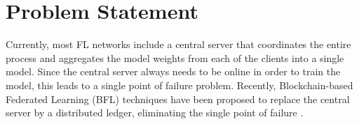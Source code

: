     
    

\section{Problem Statement}


Currently, most FL networks include a central server that coordinates the entire process and aggregates the model weights from each of the clients into a single model. Since the central server always needs to be online in order to train the model, this leads to a single point of failure problem. Recently, Blockchain-based Federated Learning (BFL) techniques have been proposed to replace the central server by a distributed ledger, eliminating the single point of failure \cite{10.48550/arxiv.2009.09338, 9403374}.



